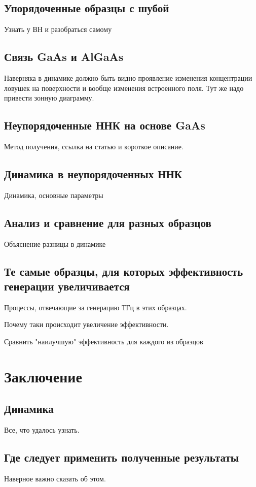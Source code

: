 \documentclass[a4paper,14pt,russian]{extreport}
\begin{document}
		\section{Упорядоченные образцы с шубой}
			Узнать у ВН и разобраться самому
		\section{Связь GaAs и AlGaAs}
			Наверняка в динамике должно быть видно проявление изменения концентрации ловушек на поверхности и вообще 					изменения встроенного поля. Тут же надо привести зонную диаграмму.
		\section{Неупорядоченные ННК на основе GaAs}
			Метод получения, ссылка на статью и короткое описание.
		\section{Динамика в неупорядоченных ННК}
			Динамика, основные параметры
		\section{Анализ и сравнение для разных образцов}
			Объяснение разницы в динамике
		\section{Те самые образцы, для которых эффективность генерации увеличивается}
			Процессы, отвечающие за генерацию ТГц в этих образцах.\par
			Почему таки происходит увеличение эффективности.\par
			Сравнить "наилучшую" эффективность для каждого из образцов
	\chapter{Заключение}
		\section{Динамика}
			Все, что удалось узнать.
		\section{Где следует применить полученные результаты}
			Наверное важно сказать об этом.
\end{document}
